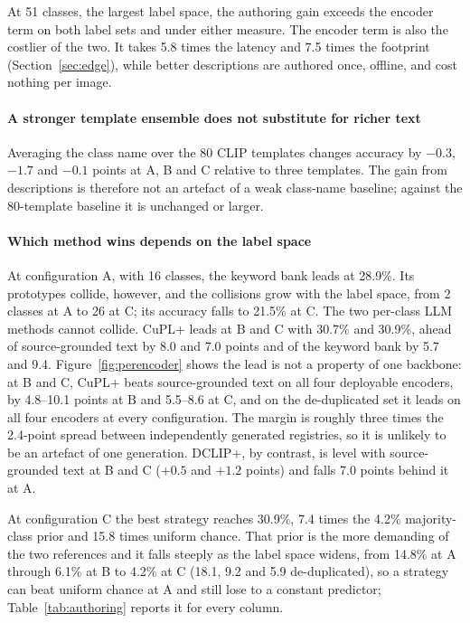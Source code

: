\documentclass[a4paper,fleqn]{cas-dc}
\begin{document}
At 51 classes, the largest label space, the authoring gain exceeds the encoder term on both label
sets and under either measure. The encoder term is also the costlier of the two. It takes 5.8 times
the latency and 7.5 times the footprint (Section~\ref{sec:edge}), while better descriptions are
authored once, offline, and cost nothing per image.

\paragraph{A stronger template ensemble does not substitute for richer text} Averaging the class
name over the 80 CLIP templates changes accuracy by $-0.3$, $-1.7$ and $-0.1$ points at A, B and C
relative to three templates. The gain from descriptions is therefore not an artefact of a weak
class-name baseline; against the 80-template baseline it is unchanged or larger.

\paragraph{Which method wins depends on the label space} At configuration A, with 16 classes, the
keyword bank leads at 28.9\%. Its prototypes collide, however, and the collisions grow with the label
space, from 2 classes at A to 26 at C; its accuracy falls to 21.5\% at C. The two per-class LLM
methods cannot collide. CuPL+ leads at B and C with 30.7\% and 30.9\%, ahead of source-grounded text
by 8.0 and 7.0 points and of the keyword bank by 5.7 and 9.4. Figure~\ref{fig:perencoder} shows the
lead is not a property of one backbone: at B and C, CuPL+ beats source-grounded text on all four
deployable encoders, by 4.8--10.1 points at B and 5.5--8.6 at C, and on the de-duplicated set it
leads on all four encoders at every configuration. The margin is roughly three times the 2.4-point
spread between independently generated registries, so it is unlikely to be an artefact of one
generation. DCLIP+, by contrast, is level with source-grounded text at B and C ($+0.5$ and $+1.2$
points) and falls 7.0 points behind it at A.

At configuration C the best strategy reaches 30.9\%, 7.4 times the 4.2\% majority-class prior and
15.8 times uniform chance. That prior is the more demanding of the two references and it falls
steeply as the label space widens, from 14.8\% at A through 6.1\% at B to 4.2\% at C (18.1, 9.2
and 5.9 de-duplicated), so a strategy can beat uniform chance at A and still lose to a constant
predictor; Table~\ref{tab:authoring} reports it for every column.
\end{document}
